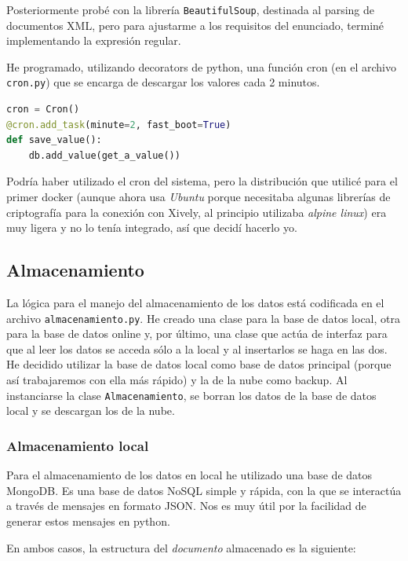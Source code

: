 \documentclass{article}
\begin{document}
Posteriormente probé con la librería \texttt{BeautifulSoup}, destinada al parsing de documentos XML, pero para ajustarme a los requisitos del enunciado, terminé implementando la expresión regular.

He programado, utilizando decorators de python, una función cron (en el archivo \texttt{cron.py}) que se encarga de descargar los valores cada 2 minutos.

\begin{lstlisting}[language=python]
cron = Cron()
@cron.add_task(minute=2, fast_boot=True)
def save_value():
    db.add_value(get_a_value())
\end{lstlisting}


Podría haber utilizado el cron del sistema, pero la distribución que utilicé para el primer docker (aunque ahora usa \emph{Ubuntu} porque necesitaba algunas librerías de criptografía para la conexión con Xively, al principio utilizaba \emph{alpine linux}) era muy ligera y no lo tenía integrado, así que decidí hacerlo yo.

\subsection{Almacenamiento}

La lógica para el manejo del almacenamiento de los datos está codificada en el archivo \texttt{almacenamiento.py}. He creado una clase para la base de datos local, otra para la base de datos online y, por último, una clase que actúa de interfaz para que al leer los datos se acceda sólo a la local y al insertarlos se haga en las dos. He decidido utilizar la base de datos local como base de datos principal (porque así trabajaremos con ella más rápido) y la de la nube como backup. Al instanciarse la clase \texttt{Almacenamiento}, se borran los datos de la base de datos local y se descargan los de la nube.

\subsubsection{Almacenamiento local}

Para el almacenamiento de los datos en local he utilizado una base de datos MongoDB. Es una base de datos NoSQL simple y rápida, con la que se interactúa a través de mensajes en formato JSON. Nos es muy útil por la facilidad de generar estos mensajes en python.

En ambos casos, la estructura del \emph{documento} almacenado es la siguiente:
\end{document}
